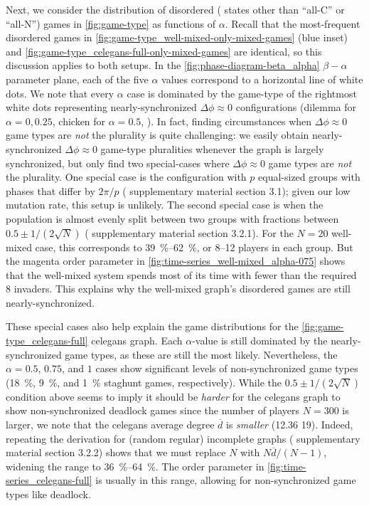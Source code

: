 \documentclass[pdflatex,lineno,referee,sn-nature]{sn-jnl}
\begin{document}
Next, we consider the distribution of disordered
(\ie{} states other than ``all-C'' or ``all-N'')
games in \cref{fig:game-type} as functions of $\alpha$.
Recall that the most-frequent disordered games
in \cref{fig:game-type_well-mixed-only-mixed-games} (blue inset)
and \cref{fig:game-type_celegans-full-only-mixed-games} are identical,
so this discussion applies to both setups.
In the \cref{fig:phase-diagram-beta_alpha}
$\beta-\alpha$ parameter plane,
each of the five $\alpha$ values
correspond to a horizontal line of white dots.
We note that every $\alpha$ case is dominated
by the game-type of the rightmost white dots
representing nearly-synchronized $\Delta \phi \approx 0$ configurations
(dilemma for $\alpha = 0, 0.25$, chicken for $\alpha = 0.5$, \etc{}).
In fact, finding circumstances when $\Delta \phi \approx 0$ game types
are \emph{not} the plurality is quite challenging:
we easily obtain nearly-synchronized $\Delta \phi \approx 0$
game-type pluralities whenever the graph is largely synchronized,
but only find two special-cases where $\Delta \phi \approx 0$ game types
are \emph{not} the plurality.
One special case is the configuration with $p$ equal-sized groups
with phases that differ by $2 \pi/p$ (\cf{} supplementary material section 3.1);
given our low mutation rate, this setup is unlikely.
The second special case is when the population is almost evenly split
between two groups with fractions between $0.5 \pm 1/(2 \sqrt{N})$
(\cf{} supplementary material section 3.2.1).
For the $N = 20$ well-mixed case, this corresponds
to \SIrange{39}{62}{\percent}, or \numrange{8}{12} players in each group.
But the magenta order parameter in \cref{fig:time-series_well-mixed_alpha-075}
shows that the well-mixed system spends most of its time
with fewer than the required \num{8} invaders.
This explains why the well-mixed graph's disordered games
are still nearly-synchronized.

These special cases also help explain the
game distributions for the
\cref{fig:game-type_celegans-full} \gls{celegans} graph.
Each $\alpha$-value is still dominated by the nearly-synchronized
game types, as these are still the most likely.
Nevertheless, the $\alpha = 0.5$, $0.75$, and $1$ cases
show significant levels of non-synchronized game types
(\SI{18}{\percent}, \SI{9}{\percent}, and \SI{1}{\percent} staghunt games,
respectively).
While the $0.5 \pm 1/(2 \sqrt{N})$ condition above seems to imply it
should be \emph{harder} for the \gls{celegans} graph to show
non-synchronized deadlock games since
the number of players $N=300$ is larger,
we note that the \gls{celegans} average degree $\overline{d}$
is \emph{smaller} (\num{12.36} \vs{} \num{19}).
Indeed, repeating the derivation for (random regular) incomplete graphs
(\cf{}  supplementary material section 3.2.2)
shows that we must replace $N$ with $N \overline{d}/(N-1)$,
widening the range to \SIrange{36}{64}{\percent}.
The order parameter in \cref{fig:time-series_celegans-full}
is usually in this range,
allowing for non-synchronized game types like deadlock.
\end{document}
